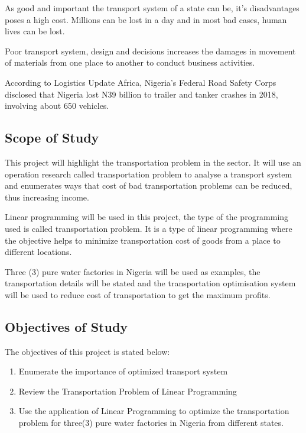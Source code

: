 \documentclass{article}
\begin{document}
As good and important the transport system of a state can be, it's disadvantages poses a high cost. Millions can be lost in a day and in most bad cases, human lives can be lost.

Poor transport system, design and decisions increases the damages in movement of materials from one place to another to conduct business activities.

According to Logistics Update Africa, Nigeria's Federal Road Safety Corps disclosed that Nigeria lost N39 billion to trailer and tanker crashes in 2018, involving about 650 vehicles.

\newpage

\begin{center}
	\subsection{Scope of Study}
\end{center}
This project will highlight the transportation problem in the sector. It will use an operation research called transportation problem to analyse a transport system and enumerates ways that cost of bad transportation problems can be reduced, thus increasing income.

Linear programming will be used in this project, the type of the programming used is called transportation problem. It is a type of linear programming where the objective helps to minimize transportation cost of goods from a place to different locations.

Three (3) pure water factories in Nigeria will be used as examples, the transportation details will be stated and the transportation optimisation system will be used to reduce cost of transportation to get the maximum profits.

\newpage

\begin{center}
\subsection{Objectives of Study}
\end{center}

The objectives of this project is stated below: \newline
\begin{enumerate}
\item Enumerate the importance of optimized transport system
\item Review the Transportation Problem of Linear Programming
\item Use the application of Linear Programming to optimize the transportation problem for three(3) pure water factories in Nigeria from different states.
\end{enumerate}
	
\end{document}
